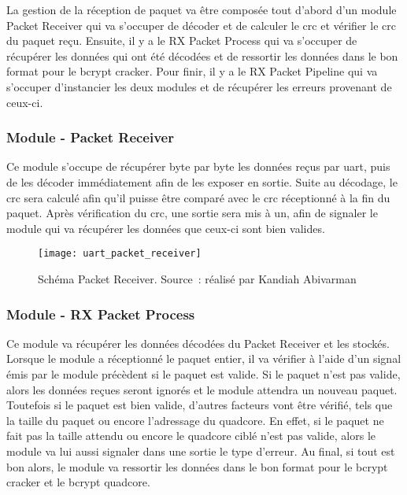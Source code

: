 La gestion de la réception de paquet va être composée tout d’abord d’un module Packet Receiver qui va s’occuper de décoder et de calculer le \gls{crc} et vérifier le \gls{crc} du paquet reçu. 
Ensuite, il y a le RX Packet Process qui va s’occuper de récupérer les données qui ont été décodées et de ressortir les données dans le bon format pour le bcrypt cracker. 
Pour finir, il y a le RX Packet Pipeline qui va s’occuper d’instancier les deux modules et de récupérer les erreurs provenant de ceux-ci.

\subsubsection{Module - Packet Receiver}

Ce module s'occupe de récupérer byte par byte les données reçus par \gls{uart}, puis de les décoder immédiatement afin de les exposer en sortie.
Suite au décodage, le \gls{crc} sera calculé afin qu'il puisse être comparé avec le \gls{crc} réceptionné à la fin du paquet.
Après vérification du \gls{crc}, une sortie sera mis à un, afin de signaler le module qui va récupérer les données que ceux-ci sont bien valides.

\begin{figure}[tbph!]
	\centering
	\texttt{[image: uart\_packet\_receiver]}
	\caption[Schéma Packet Receiver]{Schéma Packet Receiver. Source : réalisé par Kandiah Abivarman}
	\label{fig:uart_packet_receiver}
\end{figure}


\subsubsection{Module - RX Packet Process}

Ce module va récupérer les données décodées du Packet Receiver et les stockés.
Lorsque le module a réceptionné le paquet entier, il va vérifier à l'aide d'un signal émis par le module précèdent si le paquet est valide.
Si le paquet n'est pas valide, alors les données reçues seront ignorés et le module attendra un nouveau paquet.
Toutefois si le paquet est bien valide, d'autres facteurs vont être vérifié, tels que la taille du paquet ou encore l'adressage du quadcore.
En effet, si le paquet ne fait pas la taille attendu ou encore le quadcore ciblé n'est pas valide, alors le module va lui aussi signaler dans une sortie le type d'erreur.
Au final, si tout est bon alors, le module va ressortir les données dans le bon format pour le bcrypt cracker et le bcrypt quadcore.

